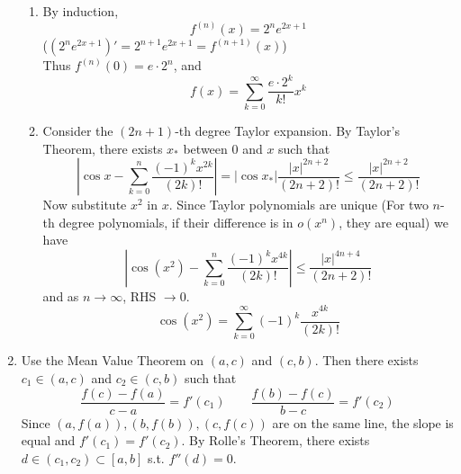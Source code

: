 \documentclass[11pt]{report}
\newcommand{\ra}{\rightarrow}
\newcommand{\abs}[1]{\left|#1\right|}
\begin{document}
\begin{enumerate}
\begin{enumerate}
	\item By induction, $$f^{(n)}(x) = 2^n e^{2x+1}$$
	($(2^n e^{2x+1})' = 2^{n+1}e^{2x+1} = f^{(n+1)}(x)$)\\
	Thus $f^{(n)}(0) = e \cdot 2^n$, and
	$$f(x) = \sum_{k=0}^\infty \frac{e\cdot 2^k }{k!}x^k$$
	\item Consider the $(2n+1)$-th degree Taylor expansion. By Taylor's Theorem, there exists $x_*$ between $0$ and $x$ such that
	$$\abs{\cos x - \sum_{k=0}^n \frac{(-1)^k x^{2k}}{(2k)!}} = \abs{\cos x_*}\frac{\abs{x}^{2n+2}}{(2n+2)!} \leq \frac{\abs{x}^{2n+2}}{(2n+2)!}$$
	Now substitute $x^2$ in $x$. Since Taylor polynomials are unique (For two $n$-th degree polynomials, if their difference is in $o(x^n)$, they are equal) we have
	$$\abs{\cos(x^2) - \sum_{k=0}^n \frac{(-1)^k x^{4k}}{(2k)!}} \leq \frac{\abs{x}^{4n+4}}{(2n+2)!}$$
	and as $n\ra \infty$, RHS $\ra0$.
	$$\cos(x^2) = \sum_{k=0}^\infty (-1)^k \frac{x^{4k}}{(2k)!}$$
\end{enumerate}

\item Use the Mean Value Theorem on $(a, c)$ and $(c, b)$. Then there exists $c_1\in (a, c)$ and $c_2\in (c, b)$ such that
$$\frac{f(c)-f(a)}{c-a}=f'(c_1)\qquad \frac{f(b)-f(c)}{b-c} = f'(c_2)$$
Since $(a, f(a)), (b, f(b)), (c, f(c))$ are on the same line, the slope is equal and $f'(c_1)=f'(c_2)$. By Rolle's Theorem, there exists $d\in (c_1, c_2)\subset [a, b]$ s.t. $f''(d) =0$.


\end{enumerate}
\end{document}
